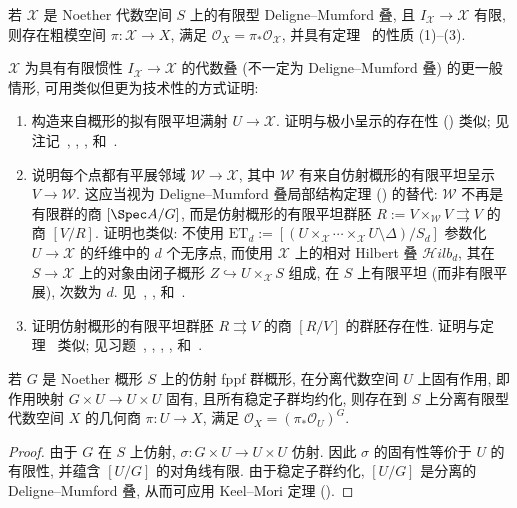 \begin{exercise}\label{src:5.4.10}
若 $\mathcal X$ 是 Noether 代数空间 $S$ 上的有限型 Deligne--Mumford 叠, 且 $I_{\mathcal X}\to\mathcal X$ 有限, 则存在粗模空间 $\pi:\mathcal X\to X$, 满足 $\mathcal O_X=\pi_*\mathcal O_{\mathcal X}$, 并具有定理~ 的性质 (1)--(3).
\end{exercise}
\begin{remark}\label{src:5.4.11}
$\mathcal X$ 为具有有限惯性 $I_{\mathcal X}\to\mathcal X$ 的代数叠 (不一定为 Deligne--Mumford 叠) 的更一般情形, 可用类似但更为技术性的方式证明:
\begin{enumerate}[{步骤} 1:]
\item 构造来自概形的拟有限平坦满射 $U\to\mathcal X$. 证明与极小呈示的存在性 () 类似; 见注记~, \cite[引理 V.7.2]{SGA3I}, \cite[引理 $3.3$]{KM97}, \cite[引理 $2.1$]{Con05b} 和~\cite[Tag 06MC]{SP}.
\item 说明每个点都有平展邻域 $\mathcal W\to\mathcal X$, 其中 $\mathcal W$ 有来自仿射概形的有限平坦呈示 $V\to\mathcal W$. 这应当视为 Deligne--Mumford 叠局部结构定理 () 的替代: $\mathcal W$ 不再是有限群的商 $[\Spec A/G]$, 而是仿射概形的有限平坦群胚 $R:=V\times_{\mathcal W}V\rightrightarrows V$ 的商 $[V/R]$. 证明也类似: 不使用 $\mathrm{ET}_d:=[(U\times_{\mathcal X}\cdots\times_{\mathcal X}U\setminus\Delta)/S_d]$ 参数化 $U\to\mathcal X$ 的纤维中的 $d$ 个无序点, 而使用 $\mathcal X$ 上的相对 Hilbert 叠 $\mathcal{H}ilb_d$, 其在 $S\to\mathcal X$ 上的对象由闭子概形 $Z\hookrightarrow U\times_{\mathcal X}S$ 组成, 在 $S$ 上有限平坦 (而非有限平展), 次数为 $d$. 见~\cite[\S$5$.A]{MF82}, \cite[命题 $4.2$]{KM97}, \cite[引理 $2.2$]{Con05b} 和~\cite[Tag 0DU4]{SP}.
\item 证明仿射概形的有限平坦群胚 $R\rightrightarrows V$ 的商 $[R/V]$ 的群胚存在性. 证明与定理~ 类似; 见习题~, \cite[定理 V.4.1]{SGA3I}, \cite[命题 $5.1$]{KM97}, \cite[定理 $3.1$]{Con05b}, \cite[定理 $6.2.2$]{Ols16} 和~\cite[Tag 0DUR]{SP}.
\end{enumerate}
\end{remark}
\begin{corollary}\label{src:5.4.12}
若 $G$ 是 Noether 概形 $S$ 上的仿射 fppf 群概形, 在分离代数空间 $U$ 上固有作用, 即作用映射 $G\times U\to U\times U$ 固有, 且所有稳定子群均约化, 则存在到 $S$ 上分离有限型代数空间 $X$ 的几何商 $\pi:U\to X$, 满足 $\mathcal O_X=(\pi_*\mathcal O_U)^G$.
\end{corollary}
\begin{proof}
由于 $G$ 在 $S$ 上仿射, $\sigma:G\times U\to U\times U$ 仿射. 因此 $\sigma$ 的固有性等价于 $U$ 的有限性, 并蕴含 $[U/G]$ 的对角线有限. 由于稳定子群约化, $[U/G]$ 是分离的 Deligne--Mumford 叠, 从而可应用 Keel--Mori 定理 ().
\end{proof}
